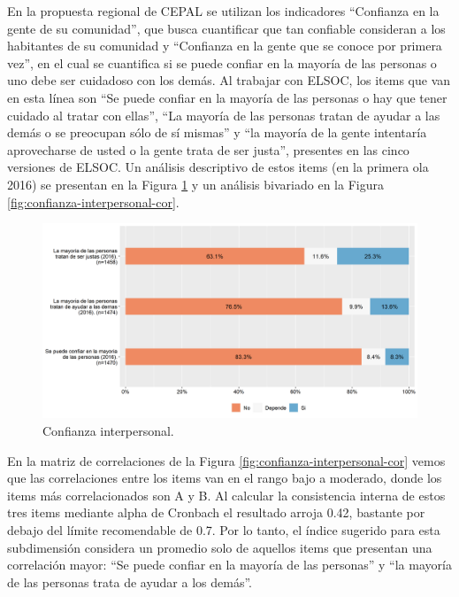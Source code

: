 \documentclass[
  12pt,
]{book}
\begin{document}
En la propuesta regional de CEPAL se utilizan los indicadores ``Confianza en la gente de su comunidad'', que busca cuantificar que tan confiable consideran a los habitantes de su comunidad y ``Confianza en la gente que se conoce por primera vez'', en el cual se cuantifica si se puede confiar en la mayoría de las personas o uno debe ser cuidadoso con los demás. Al trabajar con ELSOC, los items que van en esta línea son ``Se puede confiar en la mayoría de las personas o hay que tener cuidado al tratar con ellas'', ``La mayoría de las personas tratan de ayudar a las demás o se preocupan sólo de sí mismas'' y ``la mayoría de la gente intentaría aprovecharse de usted o la gente trata de ser justa'', presentes en las cinco versiones de ELSOC. Un análisis descriptivo de estos items (en la primera ola 2016) se presentan en la Figura \ref{fig:confianza-interpersonal} y un análisis bivariado en la Figura \ref{fig:confianza-interpersonal-cor}.

\begin{figure}[H]

{\centering \includegraphics[width=1\linewidth,height=1\textheight]{output/graphs/confianza-interpersonal} 

}

\caption{Confianza interpersonal.}\label{fig:confianza-interpersonal}
\end{figure}

En la matriz de correlaciones de la Figura \ref{fig:confianza-interpersonal-cor} vemos que las correlaciones entre los items van en el rango bajo a moderado, donde los items más correlacionados son A y B. Al calcular la consistencia interna de estos tres items mediante alpha de Cronbach el resultado arroja 0.42, bastante por debajo del límite recomendable de 0.7. Por lo tanto, el índice sugerido para esta subdimensión considera un promedio solo de aquellos items que presentan una correlación mayor: ``Se puede confiar en la mayoría de las personas'' y ``la mayoría de las personas trata de ayudar a los demás''.
\end{document}
